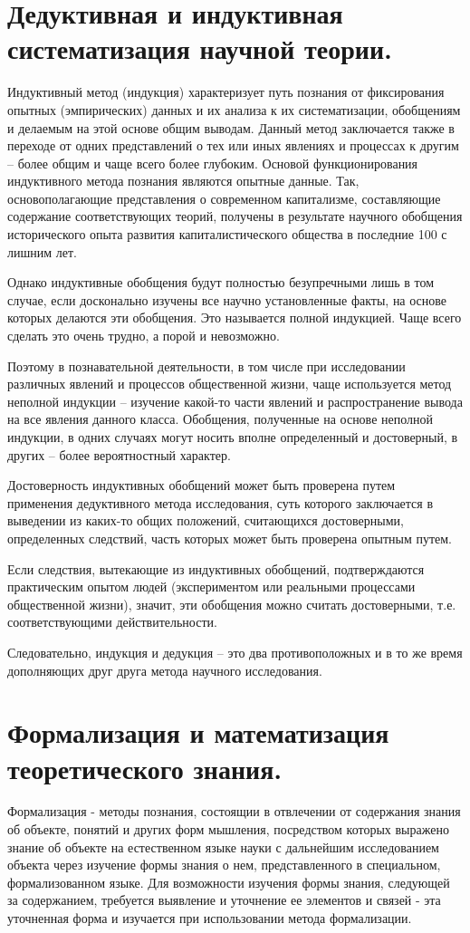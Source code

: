\documentclass[12pt, specialist, subf, substylefile = spbu.rtx]{disser}
\begin{document}
\section{Дедуктивная и индуктивная систематизация научной теории.}
Индуктивный метод (индукция) характеризует путь познания от фиксирования опытных (эмпирических) данных и их анализа к их систематизации, обобщениям и делаемым на этой основе общим выводам. Данный метод заключается также в переходе от одних представлений о тех или иных явлениях и процессах к другим – более общим и чаще всего более глубоким. Основой функционирования индуктивного метода познания являются опытные данные. Так, основополагающие представления о современном капитализме, составляющие содержание соответствующих теорий, получены в результате научного обобщения исторического опыта развития капиталистического общества в последние 100 с лишним лет.

Однако индуктивные обобщения будут полностью безупречными лишь в том случае, если досконально изучены все научно установленные факты, на основе которых делаются эти обобщения. Это называется полной индукцией. Чаще всего сделать это очень трудно, а порой и невозможно.

Поэтому в познавательной деятельности, в том числе при исследовании различных явлений и процессов общественной жизни, чаще используется метод неполной индукции – изучение какой-то части явлений и распространение вывода на все явления данного класса. Обобщения, полученные на основе неполной индукции, в одних случаях могут носить вполне определенный и достоверный, в других – более вероятностный характер.

Достоверность индуктивных обобщений может быть проверена путем применения дедуктивного метода исследования, суть которого заключается в выведении из каких-то общих положений, считающихся достоверными, определенных следствий, часть которых может быть проверена опытным путем.

Если следствия, вытекающие из индуктивных обобщений, подтверждаются практическим опытом людей (экспериментом или реальными процессами общественной жизни), значит, эти обобщения можно считать достоверными, т.е. соответствующими действительности.

Следовательно, индукция и дедукция – это два противоположных и в то же время дополняющих друг друга метода научного исследования.

\section{Формализация и математизация теоретического знания.}
Формализация - методы познания, состоящии в отвлечении от содержания знания об объекте, понятий и других форм мышления, посредством которых выражено знание об объекте на естественном языке науки с дальнейшим исследованием объекта через изучение формы знания о нем, представленного в специальном, формализованном языке. Для возможности изучения формы знания, следующей за содержанием, требуется выявление и уточнение ее элементов и связей - эта уточненная форма и изучается при использовании метода формализации.
\end{document}
